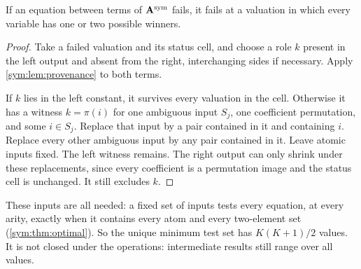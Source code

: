 \begin{theorem}\label{sym:thm:pairs}
If an equation between terms of $\mathbf A^{\rm sym}$ fails, it fails at a valuation in which every variable has one or two possible winners.
\end{theorem}
\begin{proof}
Take a failed valuation and its status cell, and choose a role $k$ present
in the left output and absent from the right, interchanging sides if
necessary. Apply \cref{sym:lem:provenance} to both terms.

If $k$ lies in the left constant, it survives every valuation in the
cell. Otherwise it has a witness $k=\pi(i)$ for one ambiguous input
$S_j$, one coefficient permutation, and some $i\in S_j$. Replace that
input by a pair contained in it and containing $i$. Replace every other
ambiguous input by any pair contained in it. Leave atomic inputs fixed. The left witness remains. The right output can only shrink under
these replacements, since every coefficient is a permutation image and
the status cell is unchanged. It still excludes $k$.
\end{proof}

These inputs are all needed: a fixed set of inputs tests every equation, at every arity, exactly when it contains every atom and every two-element set (\cref{sym:thm:optimal}). So the unique minimum test set has $K(K+1)/2$ values. It is not closed under the operations: intermediate results still range over all values.
